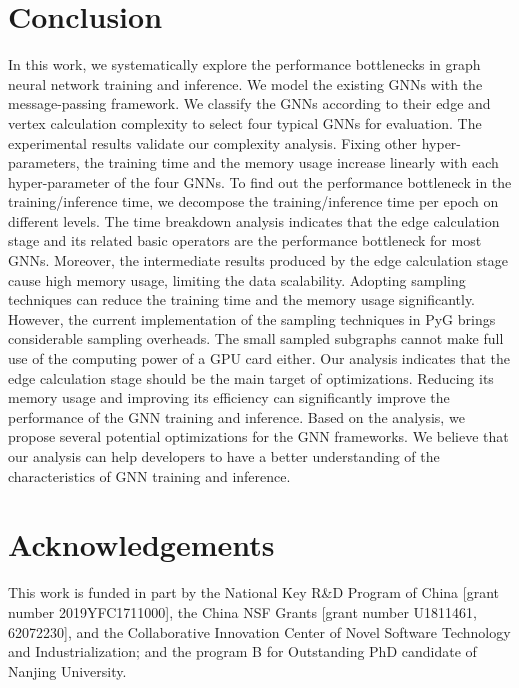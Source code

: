 \section{Conclusion}
\label{sec:conclusion}

In this work, we systematically explore the performance bottlenecks in graph neural network training and inference. 
We model the existing GNNs with the message-passing framework. 
We classify the GNNs according to their edge and vertex calculation complexity to select four typical GNNs for evaluation. 
The experimental results validate our complexity analysis. Fixing other hyper-parameters, the training time and the memory usage increase linearly with each hyper-parameter of the four GNNs. 
To find out the performance bottleneck in the training/inference time, we decompose the training/inference time per epoch on different levels. 
The time breakdown analysis indicates that the edge calculation stage and its related basic operators are the performance bottleneck for most GNNs. 
Moreover, the intermediate results produced by the edge calculation stage cause high memory usage, limiting the data scalability. 
Adopting sampling techniques can reduce the training time and the memory usage significantly. 
However, the current implementation of the sampling techniques in PyG brings considerable sampling overheads. 
The small sampled subgraphs cannot make full use of the computing power of a GPU card either. 
Our analysis indicates that the edge calculation stage should be the main target of optimizations. 
Reducing its memory usage and improving its efficiency can significantly improve the performance of the GNN training and inference. 
Based on the analysis, we propose several potential optimizations for the GNN frameworks. 
We believe that our analysis can help developers to have a better understanding of the characteristics of GNN training and inference.

\section*{Acknowledgements}

This work is funded in part by the National Key R\&D Program of China [grant number 2019YFC1711000], the China NSF Grants [grant number U1811461, 62072230], and the Collaborative Innovation Center of Novel Software Technology and Industrialization; and the program B for Outstanding PhD candidate of Nanjing University.
